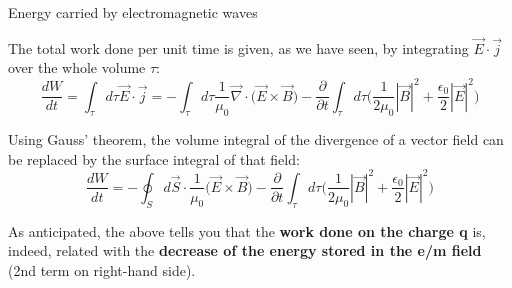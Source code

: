 \begin{frame}{Energy carried by electromagnetic waves}

The total work done per unit time is given, as we have seen, by integrating
$\vec{E} \cdot \vec{j}$ over the whole volume $\tau$:
\begin{equation*}
  \frac{dW}{dt} =  \int_{\tau} d\tau \vec{E} \cdot \vec{j} =
     - \int_{\tau} d\tau \frac{1}{\mu_0} \vec{\nabla} \cdot \Big( \vec{E} \times \vec{B} \Big)
     - \frac{\partial}{\partial t} \int_{\tau} d\tau  \Big( \frac{1}{2\mu_0} |\vec{B}|^2 + \frac{\epsilon_0}{2} |\vec{E}|^2 \Big)
\end{equation*}

\vspace{0.2cm}

Using Gauss' theorem, the volume integral of the divergence of a vector field can be replaced by the
surface integral of that field:
\begin{equation*}
  \frac{dW}{dt} =
     - \oint_{S} d\vec{S} \cdot \frac{1}{\mu_0} \Big( \vec{E} \times \vec{B} \Big)
     - \frac{\partial}{\partial t} \int_{\tau} d\tau  \Big( \frac{1}{2\mu_0} |\vec{B}|^2 + \frac{\epsilon_0}{2} |\vec{E}|^2 \Big)
\end{equation*}

As anticipated, the above tells you that the {\bf work done on the charge q} is, indeed, related with the
{\bf decrease of the energy stored in the e/m field} (2nd term on right-hand side).

\end{frame}


%
%
%
%

